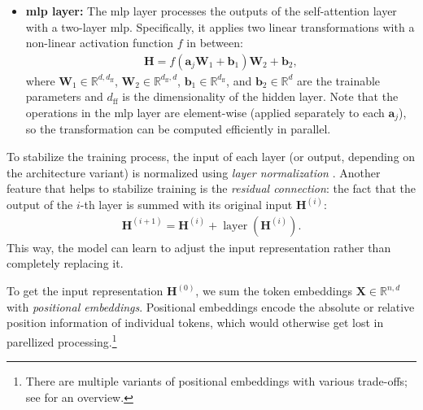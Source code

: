 {\begin{itemize}
\begin{align}
          \end{align}
          To capture different aspects of the input sequence, transformer uses $k$ \emph{attention heads}. Each head $\mathcal{H}_i$ is parametrized by a set of attention matrices $\mathbf{W}^{(\mathcal{H}_i)}_\mathbf{q}$,$\mathbf{W}^{(\mathcal{H}_i)}_\mathbf{k}$, and $\mathbf{W}^{(\mathcal{H}_i)}_\mathbf{v}$, computing the self-attention as described above. To compute the output of the self-attention layer, the output of each head is concatenated and linearly transformed using the trainable output matrix $\mathbf{W}_o$:
          \begin{align}
              \mathbf{A} = \operatorname{concat}(\operatorname{attn}^{(\mathcal{H}_1)}, \ldots, \operatorname{attn}^{(\mathcal{H}_k)})\mathbf{W}_o.
          \end{align}
    \item \textbf{\ac{mlp} layer:} The \ac{mlp} layer processes the outputs of the self-attention layer with a two-layer \ac{mlp}. Specifically, it applies two linear transformations with a non-linear activation function $f$ in between:
          \begin{align}
              \mathbf{H} = f(\mathbf{a}_j\mathbf{W}_1 + \mathbf{b}_1)\mathbf{W}_2 + \mathbf{b}_2,
          \end{align}
          where $\mathbf{W}_1 \in \mathbb{R}^{d,d_{\text{ff}}}$, $\mathbf{W}_2 \in \mathbb{R}^{d_{\text{ff}},d}$, $\mathbf{b}_1 \in \mathbb{R}^{d_{\text{ff}}}$, and $\mathbf{b}_2 \in \mathbb{R}^{d}$ are the trainable parameters and $d_{\text{ff}}$ is the dimensionality of the hidden layer. Note that the operations in the \ac{mlp} layer are element-wise (applied separately to each $\mathbf{a}_j$), so the transformation can be computed efficiently in parallel.
\end{itemize}
To stabilize the training process, the input of each layer (or output, depending on the architecture variant) is normalized using \emph{layer normalization} \cite{ba2016layer}. Another feature that helps to stabilize training is the \emph{residual connection}: the fact that the output of the $i$-th layer is summed with its original input $\mathbf{H}^{(i)}$:
\begin{align}
    \mathbf{H}^{(i+1)} = \mathbf{H}^{(i)} + \operatorname{layer}(\mathbf{H}^{(i)}).
\end{align}
This way, the model can learn to adjust the input representation rather than completely replacing it.

To get the input representation $\mathbf{H}^{(0)}$, we sum the token embeddings $\mathbf{X} \in \mathbb{R}^{n,d}$ with \emph{positional embeddings}. Positional embeddings encode the absolute or relative position information of individual tokens, which would otherwise get lost in parellized processing.\footnote{There are multiple variants of positional embeddings with various trade-offs; see \citet{dufter2022position} for an overview.}



}
